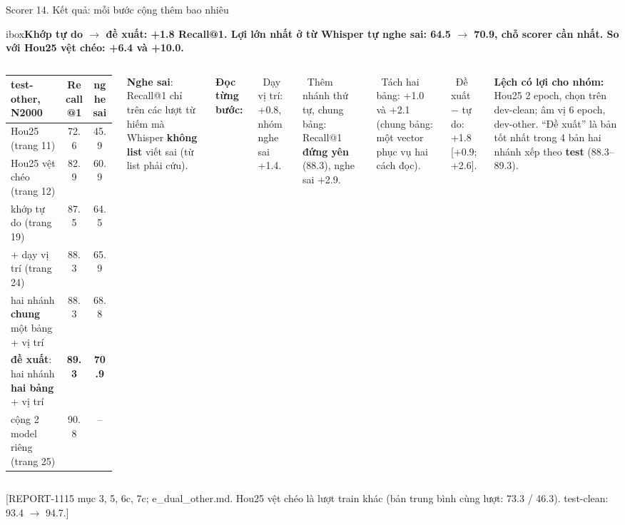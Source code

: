 \documentclass[aspectratio=169,xcolor=table]{beamer}
\newcommand{\src}[1]{\par\vfill{\tiny\color{TextGray}[#1]}}
\newcommand{\ra}{$\rightarrow$}
\newcommand{\nb}[1]{\textcolor{Accent}{#1}}
\newcommand{\insight}[1]{\begin{beamercolorbox}[sep=0.55em,rounded=true]{ibox}\small\bfseries #1\end{beamercolorbox}\vspace{0.15cm}}
\begin{document}
\begin{frame}{Scorer 14. Kết quả: mỗi bước cộng thêm bao nhiêu}
\insight{Khớp tự do \ra{} đề xuất: \nb{+1.8} Recall@1. Lợi lớn nhất ở \nb{từ Whisper tự nghe sai}: \nb{64.5 \ra{} 70.9}, chỗ scorer cần nhất. So với Hou25 vệt chéo: \nb{+6.4} và \nb{+10.0}.}
\begin{columns}[T]
\renewcommand{\arraystretch}{1.02}\scriptsize\setlength{\tabcolsep}{2.5pt}
\begin{tabular}{L{5.2cm}cc}
\toprule
test-other, N2000 & Recall@1 & nghe sai \\
\midrule
Hou25 (trang 11) & 72.6 & 45.9 \\
Hou25 vệt chéo (trang 12) & 82.9 & 60.9 \\
\midrule
khớp tự do (trang 19) & 87.5 & 64.5 \\
\quad + dạy vị trí (trang 24) & 88.3 & 65.9 \\
hai nhánh \textbf{chung} một bảng + vị trí & 88.3 & 68.8 \\
\textbf{đề xuất}: hai nhánh \textbf{hai bảng} + vị trí & \textbf{89.3} & \textbf{70.9} \\
\midrule
\textcolor{TextGray}{cộng 2 model riêng (trang 25)} & \textcolor{TextGray}{90.8} & \textcolor{TextGray}{--} \\
\bottomrule
\end{tabular}
\par\vspace{0.04cm}
{\tiny\textbf{Nghe sai}: Recall@1 chỉ trên các lượt từ hiếm mà Whisper \textbf{không list} viết sai (từ list phải cứu).\par}
{\scriptsize\textbf{Đọc từng bước:}\par
\textbullet\ Dạy vị trí: +0.8, nhóm nghe sai +1.4.\par
\textbullet\ Thêm nhánh thứ tự, chung bảng: Recall@1 \textbf{đứng yên} (88.3), nghe sai +2.9.\par
\textbullet\ Tách hai bảng: +1.0 và +2.1 (chung bảng: một vector phục vụ hai cách đọc).\par
\textbullet\ Đề xuất $-$ tự do: +1.8 [+0.9; +2.6].\par\vspace{0.03cm}}
{\tiny\color{RiskRed}\textbf{Lệch có lợi cho nhóm:} Hou25 2 epoch, chọn trên dev-clean; âm vị 6 epoch, dev-other. ``Đề xuất'' là bản tốt nhất trong 4 bản hai nhánh xếp theo \textbf{test} (88.3--89.3).\par}
\end{columns}
\src{REPORT-1115 mục 3, 5, 6c, 7c; e\_dual\_other.md. Hou25 vệt chéo là lượt train khác (bản trung bình cùng lượt: 73.3 / 46.3). test-clean: 93.4 \ra{} 94.7.}
\end{frame}
\end{document}
